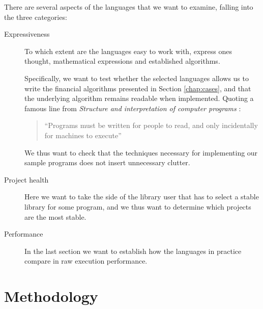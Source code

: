 

There are several aspects of the languages that we want to examine,
falling into the three categories:

\begin{description}
\item[Expressiveness] To which extent are the languages easy to work
  with, express ones thought, mathematical expressions and established
  algorithms. 

  Specifically, we want to test whether the selected languages allows
  us to write the financial algorithms presented in Section
  \ref{chap:cases}, and that the underlying algorithm remains readable
  when implemented. Quoting a famous line from \emph{Structure and
    interpretation of computer programs} \cite{abelson1996structure}:

  \begin{quote}
    ``Programs must be written for people to read, and only
    incidentally for machines to execute''
  \end{quote}

  We thus want to check that the techniques necessary for implementing
  our sample programs does not insert unnecessary clutter.
  
\item[Project health] Here we want to take the side of the library
  user that has to select a stable library for some program, and we
  thus want to determine which projects are the most stable.

\item[Performance] In the last section we want to establish how the
  languages in practice compare in raw execution performance.
\end{description}


\section{Methodology}
